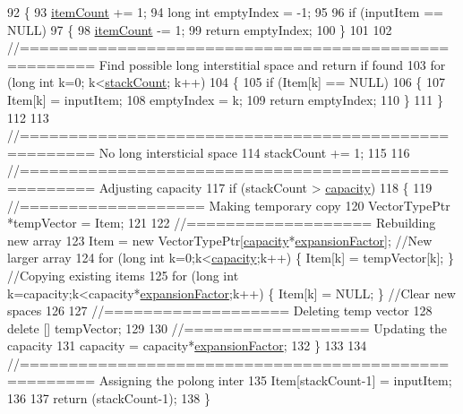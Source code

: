 \begin{DoxyCode}
92 \{
93     \hyperlink{class_c_h_i___v_e_c_t_o_r_a0d37a8a4650059da0888be2d9c38487a}{itemCount} += 1;
94     \textcolor{keywordtype}{long} \textcolor{keywordtype}{int} emptyIndex = -1;
95 
96     \textcolor{keywordflow}{if} (inputItem == NULL)
97     \{
98         \hyperlink{class_c_h_i___v_e_c_t_o_r_a0d37a8a4650059da0888be2d9c38487a}{itemCount} -= 1;
99         \textcolor{keywordflow}{return} emptyIndex;
100     \}
101 
102     \textcolor{comment}{//===================================================== Find possible long interstitial space and
       return if found}
103     \textcolor{keywordflow}{for} (\textcolor{keywordtype}{long} \textcolor{keywordtype}{int} k=0; k<\hyperlink{class_c_h_i___v_e_c_t_o_r_a91ef30712b0ead293dfe1adc29fee555}{stackCount}; k++)
104     \{
105         \textcolor{keywordflow}{if} (Item[k] == NULL)
106         \{
107             Item[k]     = inputItem;
108             emptyIndex  = k;
109             \textcolor{keywordflow}{return} emptyIndex;
110         \}
111     \}
112 
113     \textcolor{comment}{//===================================================== No long intersticial space}
114     stackCount += 1;
115 
116     \textcolor{comment}{//===================================================== Adjusting capacity}
117     \textcolor{keywordflow}{if} (stackCount > \hyperlink{class_c_h_i___v_e_c_t_o_r_ae73d9f91b472ae07bc32236605934ddb}{capacity})
118     \{
119         \textcolor{comment}{//=================== Making temporary copy}
120         VectorTypePtr *tempVector = Item;
121 
122         \textcolor{comment}{//=================== Rebuilding new array}
123         Item = \textcolor{keyword}{new} VectorTypePtr[\hyperlink{class_c_h_i___v_e_c_t_o_r_ae73d9f91b472ae07bc32236605934ddb}{capacity}*\hyperlink{class_c_h_i___v_e_c_t_o_r_a587c8d362d5149da97ec6519430c4747}{expansionFactor}];                                      \textcolor{comment}{
      //New larger array}
124         \textcolor{keywordflow}{for} (\textcolor{keywordtype}{long} \textcolor{keywordtype}{int} k=0;k<\hyperlink{class_c_h_i___v_e_c_t_o_r_ae73d9f91b472ae07bc32236605934ddb}{capacity};k++)                           \{ Item[k] = tempVector[k]; \}    \textcolor{comment}{
      //Copying existing items}
125         \textcolor{keywordflow}{for} (\textcolor{keywordtype}{long} \textcolor{keywordtype}{int} k=capacity;k<capacity*\hyperlink{class_c_h_i___v_e_c_t_o_r_a587c8d362d5149da97ec6519430c4747}{expansionFactor};k++)     \{ Item[k] = NULL; \}             \textcolor{comment}{
      //Clear new spaces}
126 
127         \textcolor{comment}{//=================== Deleting temp vector}
128         \textcolor{keyword}{delete} [] tempVector;
129 
130         \textcolor{comment}{//=================== Updating the capacity}
131         capacity = capacity*\hyperlink{class_c_h_i___v_e_c_t_o_r_a587c8d362d5149da97ec6519430c4747}{expansionFactor};
132     \}
133 
134     \textcolor{comment}{//===================================================== Assigning the polong inter}
135     Item[stackCount-1] = inputItem;
136 
137     \textcolor{keywordflow}{return} (stackCount-1);
138 \}
\end{DoxyCode}
